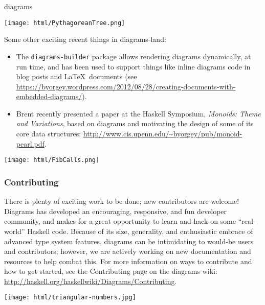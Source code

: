 \begin{hcarentry}[updated]{diagrams}
\begin{center}
\texttt{[image: html/PythagoreanTree.png]}
\end{center}

Some other exciting recent things in diagrams-land:
\begin{itemize}
\item The \texttt{diagrams-builder} package allows rendering diagrams
  dynamically, at run time, and has been used to support things like
  inline diagrams code in blog posts and \LaTeX\ documents (see
  \url{https://byorgey.wordpress.com/2012/08/28/creating-documents-with-embedded-diagrams/}).
\item Brent recently presented a paper at the Haskell Symposium,
  \emph{Monoids: Theme and Variations}, based on diagrams and
  motivating the design of some of its core data structures:
  \url{http://www.cis.upenn.edu/~byorgey/pub/monoid-pearl.pdf}.
\end{itemize}

\begin{center}
\texttt{[image: html/FibCalls.png]}
\end{center}

\subsubsection*{Contributing}

There is plenty of exciting work to be done; new contributors are
welcome!  Diagrams has developed an encouraging, responsive, and fun
developer community, and makes for a great opportunity to learn and
hack on some ``real-world'' Haskell code.  Because of its size,
generality, and enthusiastic embrace of advanced type system features,
diagrams can be intimidating to would-be users and contributors;
however, we are actively working on new documentation and resources to
help combat this.  For more information on ways to contribute and how
to get started, see the Contributing page on the diagrams wiki:
\url{http://haskell.org/haskellwiki/Diagrams/Contributing}.

\begin{center}
\texttt{[image: html/triangular-numbers.jpg]}
\end{center}


\end{hcarentry}
